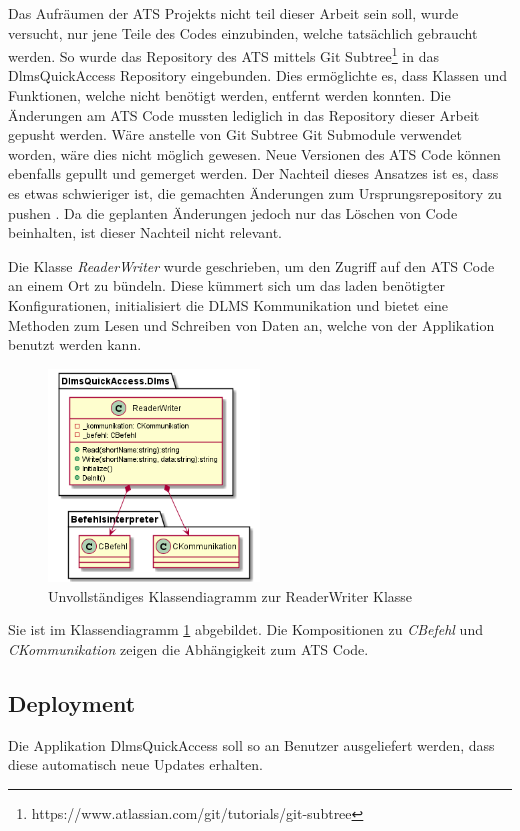 Das Aufräumen der \ac{ATS} Projekts nicht teil dieser Arbeit sein soll, wurde versucht, nur jene Teile des Codes einzubinden, welche tatsächlich gebraucht werden.
So wurde das Repository des \ac{ATS} mittels Git Subtree\footnote{https://www.atlassian.com/git/tutorials/git-subtree} in das DlmsQuickAccess Repository eingebunden. 
Dies ermöglichte es, dass Klassen und Funktionen, welche nicht benötigt werden, entfernt werden konnten.
Die Änderungen am \ac{ATS} Code mussten lediglich in das Repository dieser Arbeit gepusht werden.
Wäre anstelle von Git Subtree Git Submodule verwendet worden, wäre dies nicht möglich gewesen.
Neue Versionen des \ac{ATS} Code können ebenfalls gepullt und gemerget werden. 
Der Nachteil dieses Ansatzes ist es, dass es etwas schwieriger ist, die gemachten Änderungen zum Ursprungsrepository zu pushen \parencite{gitSubtree}.
Da die geplanten Änderungen jedoch nur das Löschen von Code beinhalten, ist dieser Nachteil nicht relevant.

Die Klasse \textit{ReaderWriter} wurde geschrieben, um den Zugriff auf den \ac{ATS} Code an einem Ort zu bündeln.
Diese kümmert sich um das laden benötigter Konfigurationen, initialisiert die \ac{DLMS} Kommunikation und bietet eine Methoden zum Lesen und Schreiben von Daten an, welche von der Applikation benutzt werden kann.
\begin{figure}[H]
   \centering
   \includegraphics[width=0.5\textwidth]{gfx/readerwriter.png}
   \caption{
      Unvollständiges Klassendiagramm zur ReaderWriter Klasse
      }
      \label{fig:readerwriter}
\end{figure}
Sie ist im Klassendiagramm \ref{fig:readerwriter} abgebildet.
Die Kompositionen zu \textit{CBefehl} und \textit{CKommunikation} zeigen die Abhängigkeit zum \ac{ATS} Code.



\subsection{Deployment}
\dq Die Applikation DlmsQuickAccess soll so an Benutzer ausgeliefert werden, dass diese automatisch neue Updates erhalten.\dq

